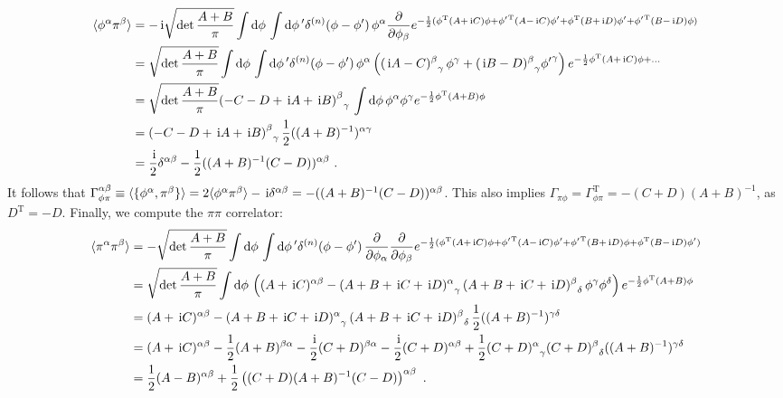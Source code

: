 \documentclass[letter]{article}
\newcommand{\intd}[1]{\int\mathrm{d}#1\,}
\begin{document}
\begin{align}
\langle \phi^\alpha \pi^\beta \rangle &= -\i \sqrt{\det\frac{A+B}{\pi}} \intd\phi \intd\phi^\prime  \delta^{(n)}(\phi - \phi^\prime)\, \phi^\alpha \frac{\partial}{\partial\phi_\beta} e^{ -\frac{1}{2} (\phi^\mathrm{T} (A+\i C) \phi + {\phi^\prime}^\mathrm{T} (A-\i C) \phi^\prime + \phi^\mathrm{T} (B+\i D) \phi^\prime  + {\phi^\prime}^\mathrm{T} (B-\i D) \phi) } \nonumber\\
&= \sqrt{\det\frac{A+B}{\pi}} \intd\phi \intd\phi^\prime  \delta^{(n)}(\phi - \phi^\prime)\, \phi^\alpha \left( {(\i A-C)^\beta}_\gamma\,\phi^\gamma + {(\i B - D)^\beta}_\gamma {\phi^\prime}^\gamma \right) e^{ -\frac{1}{2} \phi^\mathrm{T} (A+\i C) \phi + \dots } \nonumber\\
&= \sqrt{\det\frac{A+B}{\pi}} {\left( -C - D + \i A + \i B \right)^\beta}_\gamma\, \intd\phi \phi^\alpha \phi^\gamma e^{ -\frac{1}{2} \phi^\mathrm{T} (A+B) \phi } \nonumber\\
&= {\left( -C - D + \i A + \i B \right)^\beta}_\gamma\, \frac{1}{2} ((A+B)^{-1})^{\alpha\gamma} \nonumber\\
&= \frac{\i}{2} \delta^{\alpha\beta} - \frac{1}{2} ((A+B)^{-1}(C-D))^{\alpha\beta}\ .
\end{align}
It follows that $\Gamma^{\alpha\beta}_{\phi\pi} \equiv \langle \{ \phi^\alpha, \pi^\beta \} \rangle = 2 \langle \phi^\alpha\pi^\beta \rangle - \,\mathrm{i}\delta^{\alpha\beta} = -((A+B)^{-1}(C-D))^{\alpha\beta}$. This also implies $\Gamma_{\pi\phi} = \Gamma_{\phi\pi}^\mathrm{T} = -(C+D) (A+B)^{-1}$, as $D^\mathrm{T}=-D$.
Finally, we compute the $\pi\pi$ correlator:
\begin{align}
\langle \pi^\alpha \pi^\beta \rangle &= - \sqrt{\det\frac{A+B}{\pi}} \intd\phi \intd\phi^\prime  \delta^{(n)}(\phi - \phi^\prime)\,\frac{\partial}{\partial\phi_\alpha}\frac{\partial}{\partial\phi_\beta} e^{ -\frac{1}{2} (\phi^\mathrm{T} (A+\i C) \phi + {\phi^\prime}^\mathrm{T} (A-\i C) \phi^\prime + {\phi^\prime}^\mathrm{T} (B+\i D) \phi + \phi^\mathrm{T} (B-\i D) \phi^\prime ) } \nonumber\\
&= \sqrt{\det\frac{A+B}{\pi}} \intd\phi \left( (A+\i C)^{\alpha\beta} - {(A+B + \i C + \i D)^\alpha}_\gamma\, {(A+B + \i C + \i D)^\beta}_\delta\, \phi^\gamma \phi^\delta \right) e^{ -\frac{1}{2} \phi^\mathrm{T} (A+B) \phi } \nonumber\\
&= (A+\i C)^{\alpha\beta} - {(A+B + \i C + \i D)^\alpha}_\gamma\, {(A+B+ \i C + \i D)^\beta}_\delta\, \frac{1}{2} ((A+B)^{-1})^{\gamma\delta} \nonumber\\
&= (A+\i C)^{\alpha\beta} - \frac{1}{2} (A+B)^{\beta\alpha} - \frac{\i}{2}(C+D)^{\beta\alpha} - \frac{\i}{2} (C+D)^{\alpha\beta} + \frac{1}{2} {(C+D)^\alpha}_\gamma {(C+D)^\beta}_\delta ((A+B)^{-1})^{\gamma\delta} \nonumber\\
&= \frac{1}{2}(A - B)^{\alpha\beta} + \frac{1}{2} \left( (C+D)(A+B)^{-1}(C-D) \right)^{\alpha\beta}\ .
\end{align}
\end{document}
